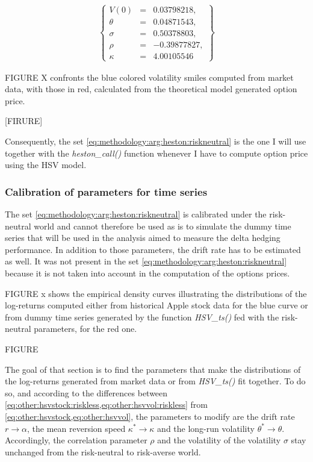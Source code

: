 \documentclass[12pt]{report}
\begin{document}
\begin{align}
  \left \{
  \begin{array}{lcl}
    V(0) &= &0.03798218, \\
    \theta &= &0.04871543, \\
    \sigma &= &0.50378803, \\
    \rho &= &-0.39877827, \\
    \kappa &= &4.00105546 
  \end{array}
  \right \}  
  \label{eq:methodology:arg:heston:riskneutral}
\end{align}

FIGURE X confronts the blue colored volatility smiles computed from market data, with those in red, calculated from the theoretical model generated option price.

[FIRURE]


Consequently, the set \ref{eq:methodology:arg:heston:riskneutral} is the one I will use together with the \textit{heston\_call()} function whenever I have to compute option price using the HSV model.

\subsubsection*{Calibration of parameters for time series}

The  set \ref{eq:methodology:arg:heston:riskneutral} is calibrated under the risk-neutral world and cannot therefore be used as is to simulate the dummy time series that will be used in the analysis aimed to measure the delta hedging performance.
In addition to those parameters, the drift rate has to be estimated as well. It was not present in the set  \ref{eq:methodology:arg:heston:riskneutral} because it is not taken into account in the computation of the options prices.

FIGURE x shows the empirical density curves illustrating the distributions of the log-returns computed either from historical Apple stock data for the blue curve or from dummy time series generated by the function \textit{HSV\_ts()} fed with the risk-neutral parameters, for the red one.


{FIGURE}


The goal of that section is to find the parameters that make the distributions of the log-returns generated from market data or from \textit{HSV\_ts()} fit together.
To do so, and according to the differences between \cref{eq:other:hsvstock:riskless,eq:other:hsvvol:riskless} from \cref{eq:other:hsvstock,eq:other:hsvvol}, the parameters to modify are the drift rate $r \to \alpha$, the mean reversion speed $\kappa^{*} \to \kappa$ and the long-run volatility $\theta^* \to \theta$.
Accordingly, the correlation parameter $\rho$ and the volatility of the volatility $\sigma$ stay unchanged from  the risk-neutral to risk-averse world.
\end{document}
